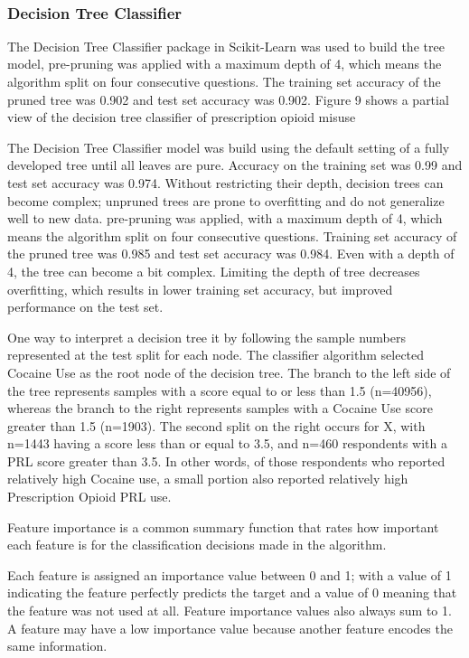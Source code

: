 \\\documentclass[sigconf]{acmart}
\begin{document}

\subsubsection{Decision Tree Classifier}

The Decision Tree Classifier package in Scikit-Learn was used to build the 
tree model, pre-pruning was applied with a maximum depth of 4, which means 
the algorithm split on four consecutive questions. The training set accuracy 
of the pruned tree was 0.902 and test set accuracy was 0.902. Figure 9 shows 
a partial view of the decision tree classifier of prescription opioid misuse

The Decision Tree Classifier model was build using the default setting of a 
fully developed tree until all leaves are pure. Accuracy on the
training set was 0.99 and test set accuracy was 0.974.
Without restricting 
their depth, decision trees can become complex; unpruned trees are prone to 
overfitting and do not generalize well to new data. 
pre-pruning was applied, with 
a maximum depth of 4, which means the algorithm split on four consecutive
questions. Training set accuracy of the pruned tree was 0.985 and test set
accuracy was 0.984. Even with a depth of 4, the tree can become a bit complex.
Limiting the depth of 
tree decreases overfitting, which results in lower training set accuracy, 
but improved performance on the test set. 

One way to interpret a decision tree it by following the sample numbers 
represented at the test split for each node. The classifier algorithm 
selected Cocaine Use as the root node of the decision tree. 
The branch to the left  side of the tree represents samples with a score equal 
to or less than 1.5 (n=40956), whereas the branch to the right represents 
samples with a Cocaine Use score greater than 1.5 (n=1903). The second split 
on the right occurs for X, with n=1443 having a score less than or equal 
to 3.5, and n=460 respondents with a PRL score greater than 3.5. In other 
words, of those respondents who reported relatively high Cocaine use, a small
portion also reported relatively high Prescription Opioid PRL use.


Feature importance is a common summary function that rates how important 
each feature is for the classification decisions made in the algorithm. 

Each feature is assigned an importance value between 0 and 1; with a value of 
1 indicating the feature perfectly predicts the target and a value of 0 meaning 
that the feature was not used at all. Feature importance values also always 
sum to 1. A feature may have a low importance value because another feature 
encodes the same information. 
\end{document}
